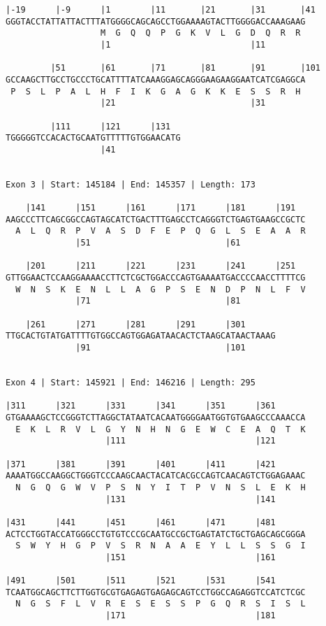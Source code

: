 \documentclass{article}
\begin{document}
\begin{Verbatim}
|-19      |-9      |1        |11       |21       |31       |41
GGGTACCTATTATTACTTTATGGGGCAGCAGCCTGGAAAAGTACTTGGGGACCAAAGAAG
                   M  G  Q  Q  P  G  K  V  L  G  D  Q  R  R 
                   |1                            |11        
  
         |51       |61       |71       |81       |91       |101
GCCAAGCTTGCCTGCCCTGCATTTTATCAAAGGAGCAGGGAAGAAGGAATCATCGAGGCA
 P  S  L  P  A  L  H  F  I  K  G  A  G  K  K  E  S  S  R  H 
                   |21                           |31        
  
         |111      |121      |131  
TGGGGGTCCACACTGCAATGTTTTTGTGGAACATG
                   |41             
  
 
Exon 3 | Start: 145184 | End: 145357 | Length: 173
 
    |141      |151      |161      |171      |181      |191  
AAGCCCTTCAGCGGCCAGTAGCATCTGACTTTGAGCCTCAGGGTCTGAGTGAAGCCGCTC
  A  L  Q  R  P  V  A  S  D  F  E  P  Q  G  L  S  E  A  A  R
              |51                           |61             
  
    |201      |211      |221      |231      |241      |251  
GTTGGAACTCCAAGGAAAACCTTCTCGCTGGACCCAGTGAAAATGACCCCAACCTTTTCG
  W  N  S  K  E  N  L  L  A  G  P  S  E  N  D  P  N  L  F  V
              |71                           |81             
  
    |261      |271      |281      |291      |301      
TTGCACTGTATGATTTTGTGGCCAGTGGAGATAACACTCTAAGCATAACTAAAG
              |91                           |101      
  
 
Exon 4 | Start: 145921 | End: 146216 | Length: 295
 
|311      |321      |331      |341      |351      |361      
GTGAAAAGCTCCGGGTCTTAGGCTATAATCACAATGGGGAATGGTGTGAAGCCCAAACCA
  E  K  L  R  V  L  G  Y  N  H  N  G  E  W  C  E  A  Q  T  K
                    |111                          |121      
  
|371      |381      |391      |401      |411      |421      
AAAATGGCCAAGGCTGGGTCCCAAGCAACTACATCACGCCAGTCAACAGTCTGGAGAAAC
  N  G  Q  G  W  V  P  S  N  Y  I  T  P  V  N  S  L  E  K  H
                    |131                          |141      
  
|431      |441      |451      |461      |471      |481      
ACTCCTGGTACCATGGGCCTGTGTCCCGCAATGCCGCTGAGTATCTGCTGAGCAGCGGGA
  S  W  Y  H  G  P  V  S  R  N  A  A  E  Y  L  L  S  S  G  I
                    |151                          |161      
  
|491      |501      |511      |521      |531      |541      
TCAATGGCAGCTTCTTGGTGCGTGAGAGTGAGAGCAGTCCTGGCCAGAGGTCCATCTCGC
  N  G  S  F  L  V  R  E  S  E  S  S  P  G  Q  R  S  I  S  L
                    |171                          |181      
  

\end{Verbatim}
\end{document}
